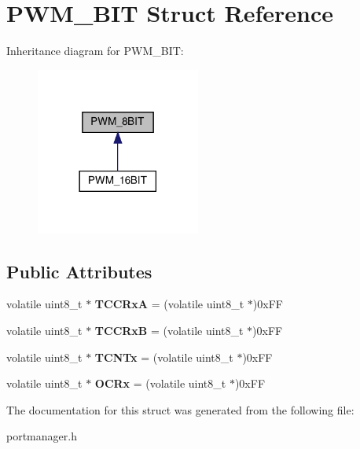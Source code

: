 \hypertarget{structPWM__8BIT}{}\section{P\+W\+M\+\_\+B\+IT Struct Reference}
\label{structPWM__8BIT}


Inheritance diagram for P\+W\+M\+\_\+B\+IT\+:\nopagebreak
\begin{figure}[H]
\begin{center}
\leavevmode
\includegraphics[width=153pt]{structPWM__8BIT__inherit__graph}
\end{center}
\end{figure}
\subsection*{Public Attributes}
\begin{DoxyCompactItemize}
\item 
\mbox{\label{structPWM__8BIT_a67a66abe93d97084f94c41c4bb4264b7}} 
volatile uint8\+\_\+t $\ast$ {\bfseries T\+C\+C\+RxA} = (volatile uint8\+\_\+t $\ast$)0x\+FF
\item 
\mbox{\label{structPWM__8BIT_a9b5a0f38311b0914a5011204a0039255}} 
volatile uint8\+\_\+t $\ast$ {\bfseries T\+C\+C\+RxB} = (volatile uint8\+\_\+t $\ast$)0x\+FF
\item 
\mbox{\label{structPWM__8BIT_ad1f2062ca0b4dce0decf2282f045f56e}} 
volatile uint8\+\_\+t $\ast$ {\bfseries T\+C\+N\+Tx} = (volatile uint8\+\_\+t $\ast$)0x\+FF
\item 
\mbox{\label{structPWM__8BIT_aac6d531b2442f9217341d7c1e27aa54d}} 
volatile uint8\+\_\+t $\ast$ {\bfseries O\+C\+Rx} = (volatile uint8\+\_\+t $\ast$)0x\+FF
\end{DoxyCompactItemize}


The documentation for this struct was generated from the following file\+:\begin{DoxyCompactItemize}
\item 
portmanager.\+h\end{DoxyCompactItemize}
